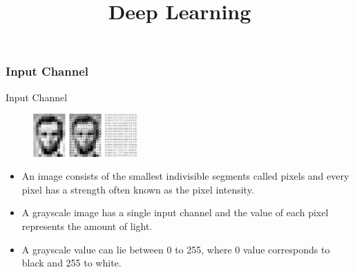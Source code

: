 




\newcommand{\titlefigure}{figure/gray.png} %
\newcommand{\learninggoals}{
  \item Input Channel for Gray Images
  \item Input Channels for Colored Images
  \item Output Dimension Calculation
}

\title{Deep Learning}
\date{}






\frametitle{Input Channel}

\begin{vbframe}{Input Channel}
         \begin{figure}
    \centering
    \includegraphics[width=4cm]{figure/gray.png}
  \end{figure}
    \begin{itemize}
    
       \item An image consists of the smallest indivisible segments called pixels and every pixel has a strength often known as the pixel intensity. 
       
       \item A grayscale image has a single input channel and the value of each pixel represents the amount of light.
       
       \item A grayscale value can lie between 0 to 255, where 0 value corresponds to black and 255 to white.
       
       
    \end{itemize}

\end{vbframe}

